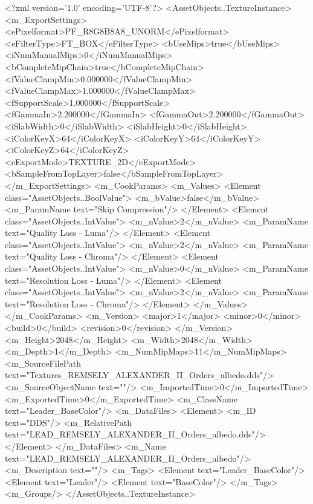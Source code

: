 <?xml version='1.0' encoding='UTF-8'?>
<AssetObjects..TextureInstance>
  <m_ExportSettings>
    <ePixelformat>PF_R8G8B8A8_UNORM</ePixelformat>
    <eFilterType>FT_BOX</eFilterType>
    <bUseMips>true</bUseMips>
    <iNumManualMips>0</iNumManualMips>
    <bCompleteMipChain>true</bCompleteMipChain>
    <fValueClampMin>0.000000</fValueClampMin>
    <fValueClampMax>1.000000</fValueClampMax>
    <fSupportScale>1.000000</fSupportScale>
    <fGammaIn>2.200000</fGammaIn>
    <fGammaOut>2.200000</fGammaOut>
    <iSlabWidth>0</iSlabWidth>
    <iSlabHeight>0</iSlabHeight>
    <iColorKeyX>64</iColorKeyX>
    <iColorKeyY>64</iColorKeyY>
    <iColorKeyZ>64</iColorKeyZ>
    <eExportMode>TEXTURE_2D</eExportMode>
    <bSampleFromTopLayer>false</bSampleFromTopLayer>
  </m_ExportSettings>
  <m_CookParams>
    <m_Values>
      <Element class="AssetObjects..BoolValue">
        <m_bValue>false</m_bValue>
        <m_ParamName text="Skip Compression"/>
      </Element>
      <Element class="AssetObjects..IntValue">
        <m_nValue>2</m_nValue>
        <m_ParamName text="Quality Loss - Luma"/>
      </Element>
      <Element class="AssetObjects..IntValue">
        <m_nValue>2</m_nValue>
        <m_ParamName text="Quality Loss - Chroma"/>
      </Element>
      <Element class="AssetObjects..IntValue">
        <m_nValue>0</m_nValue>
        <m_ParamName text="Resolution Loss - Luma"/>
      </Element>
      <Element class="AssetObjects..IntValue">
        <m_nValue>2</m_nValue>
        <m_ParamName text="Resolution Loss - Chroma"/>
      </Element>
    </m_Values>
  </m_CookParams>
  <m_Version>
    <major>1</major>
    <minor>0</minor>
    <build>0</build>
    <revision>0</revision>
  </m_Version>
  <m_Height>2048</m_Height>
  <m_Width>2048</m_Width>
  <m_Depth>1</m_Depth>
  <m_NumMipMaps>11</m_NumMipMaps>
  <m_SourceFilePath text="Textures\LEAD_REMSELY_ALEXANDER_II_Orders_albedo.dds"/>
  <m_SourceObjectName text=""/>
  <m_ImportedTime>0</m_ImportedTime>
  <m_ExportedTime>0</m_ExportedTime>
  <m_ClassName text="Leader_BaseColor"/>
  <m_DataFiles>
    <Element>
      <m_ID text="DDS"/>
      <m_RelativePath text="LEAD_REMSELY_ALEXANDER_II_Orders_albedo.dds"/>
    </Element>
  </m_DataFiles>
  <m_Name text="LEAD_REMSELY_ALEXANDER_II_Orders_albedo"/>
  <m_Description text=""/>
  <m_Tags>
    <Element text="Leader_BaseColor"/>
    <Element text="Leader"/>
    <Element text="BaseColor"/>
  </m_Tags>
  <m_Groups/>
</AssetObjects..TextureInstance>
